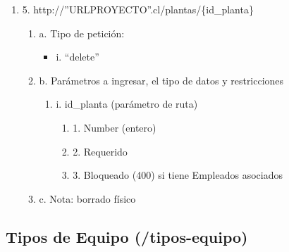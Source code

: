 \begin{enumerate}
    \item 5. http://”URLPROYECTO”.cl/plantas/\{id\_planta\}
    \begin{enumerate}
        \item a. Tipo de petición:
            \begin{itemize}
               \item i. “delete”
            \end{itemize}
        \item b. Parámetros a ingresar, el tipo de datos y restricciones
            \begin{enumerate}
                \item i. id\_planta (parámetro de ruta)
                    \begin{enumerate}
                        \item 1. Number (entero)
                        \item 2. Requerido
                        \item 3. Bloqueado (400) si tiene Empleados asociados
                    \end{enumerate}
            \end{enumerate}
        \item c. Nota: borrado físico
    \end{enumerate}
\end{enumerate}

\subsection{Tipos de Equipo (/tipos-equipo)}

